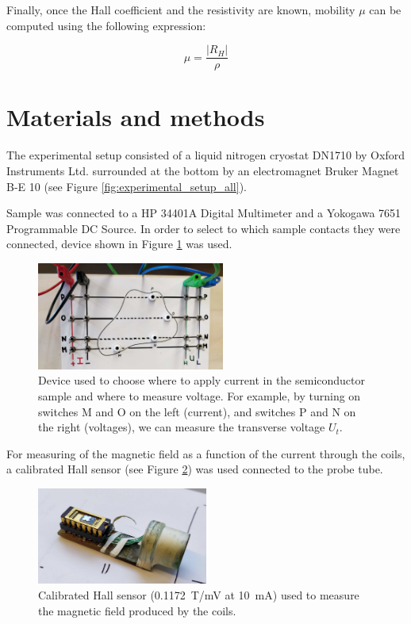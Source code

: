\documentclass[11pt,a4paper]{article}
\begin{document}
Finally, once the Hall coefficient and the resistivity are known, mobility $\mu$ can be computed using the following expression:

\begin{equation}\label{eq:mobility_exp}
\mu=\frac{|R_H|}{\rho}
\end{equation}

\newpage
\section{Materials and methods}

The experimental setup consisted of a liquid nitrogen cryostat DN1710 by Oxford Instruments Ltd. surrounded at the bottom by an electromagnet Bruker Magnet B-E 10 (see Figure \ref{fig:experimental_setup_all}).

Sample was connected to a HP 34401A Digital Multimeter and a Yokogawa 7651 Programmable DC Source. In order to select to which sample contacts they were connected, device shown in Figure \ref{fig:cables} was used.

\begin{figure}[H]
\centering
\includegraphics[width=0.55\textwidth]{Experimental_setup_cables}
\caption{Device used to choose where to apply current in the semiconductor sample and where to measure voltage. For example, by turning on switches M and O on the left (current), and switches P and N on the right (voltages), we can measure the transverse voltage $U_t$.}
\label{fig:cables}
\end{figure}

For measuring of the magnetic field as a function of the current through the coils, a calibrated Hall sensor (see Figure \ref{fig:Hall_sensor}) was used connected to the probe tube.

\begin{figure}[H]
\centering
\includegraphics[width=0.5\textwidth]{Hall_sensor}
\caption{Calibrated Hall sensor (\SI{0.1172}{\tesla/\milli\volt} at \SI{10}{\milli\ampere}) used to measure the magnetic field produced by the coils.}
\label{fig:Hall_sensor}
\end{figure}
\end{document}
